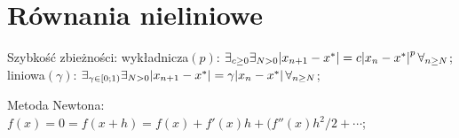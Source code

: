 \section{Równania nieliniowe}



\entry
Szybkość zbieżności:
wykładnicza$(p)$:
$\exists_{c \geq 0} \exists_{N > 0}
\abs{x_{n + 1} - x^{*}} = c \abs{x_n - x^{*}}^p \forall_{n \geq N}$;
liniowa$(\gamma)$:
$\exists_{\gamma \in [0;1)} \exists_{N > 0}
\abs{x_{n + 1} - x^{*}} = \gamma \abs{x_n - x^{*}} \forall_{n \geq N}$;

\entry
Metoda Newtona:
$f(x) = 0 = f(x+h) = f(x) + f'(x)h + (f''(x)h^2/2+\cdots$;








